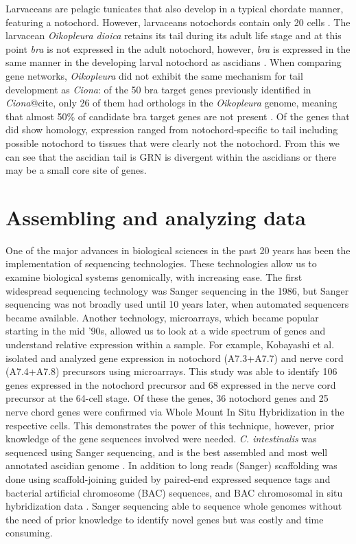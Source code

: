 Larvaceans are pelagic tunicates that also develop in a typical chordate manner, featuring  a notochord. However, larvaceans notochords contain only 20 cells \cite{seo_miniature_2001,denoeud_plasticity_2010}. The larvacean  \textit{Oikopleura dioica} retains its tail during its adult life stage and at this point \textit{bra} is not expressed in the adult notochord, however, \textit{bra} is expressed in the same manner in the developing larval notochord as ascidians \cite{bassham_brachyury_2000,nishida_development_2008}. When comparing gene networks, \textit{Oikopleura} did not exhibit the same mechanism for tail development as \textit{Ciona}: of the 50 bra target genes previously identified in \textit{Ciona}@cite, only 26 of them had orthologs in the \textit{Oikopleura} genome, meaning that almost 50\% of candidate bra target  genes are not present \cite{kugler_evolutionary_2011}. Of the genes that did show homology, expression ranged from notochord-specific to tail including possible notochord to tissues that were clearly not the notochord. From this we can see that the ascidian tail is GRN is divergent within the ascidians or there may be a small core site of genes.

\section{Assembling and analyzing data}

One of the major advances in biological sciences in the past 20 years has been the implementation of sequencing technologies. These technologies allow us to examine biological systems genomically, with increasing ease. The first widespread sequencing technology was Sanger sequencing in the 1986, but Sanger sequencing was not broadly used until 10 years later, when automated sequencers became available. Another technology, microarrays, which became popular starting in the mid '90s, allowed us to look at a wide spectrum of genes and understand relative expression within a sample. For example, Kobayashi et al. \cite{kobayashi_differential_2013} isolated and analyzed gene expression in notochord (A7.3+A7.7) and nerve cord (A7.4+A7.8) precursors using microarrays. This study was able to identify 106 genes expressed in the notochord precursor and 68 expressed in the nerve cord precursor at the 64-cell stage. Of these the genes, 36 notochord genes and 25 nerve chord genes were confirmed via Whole Mount In Situ Hybridization in the respective cells. This demonstrates the power of this technique, however, prior knowledge of the gene sequences involved were needed. \textit{C. intestinalis} was sequenced using Sanger sequencing, and is the best assembled and most well annotated ascidian genome \cite{dehal_draft_2002}. In addition to long reads (Sanger) scaffolding was done using scaffold-joining guided by paired-end expressed sequence tags and bacterial artificial chromosome (BAC) sequences, and BAC chromosomal in situ hybridization data \cite{satou_improved_2008}. Sanger sequencing able to sequence whole genomes without the need of prior knowledge to identify novel genes but was costly and time consuming\cite{metzker_emerging_2005,liu_comparison_2012}. 

